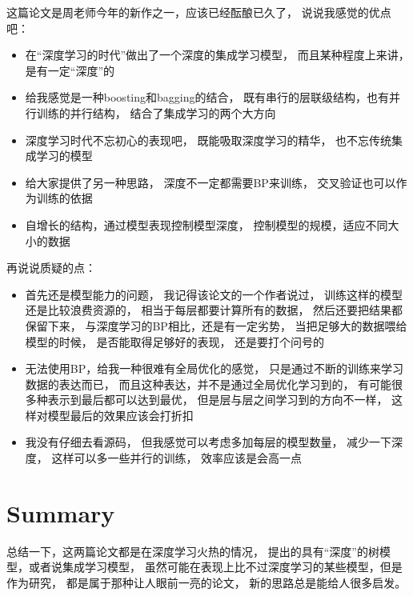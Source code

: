 \documentclass[UTF8]{ctexart}
\begin{document}
这篇论文是周老师今年的新作之一，应该已经酝酿已久了，
说说我感觉的优点吧：
\begin{itemize}
\item
在“深度学习的时代”做出了一个深度的集成学习模型，
而且某种程度上来讲，是有一定“深度”的
\item
给我感觉是一种boosting和bagging的结合，
既有串行的层联级结构，也有并行训练的并行结构，
结合了集成学习的两个大方向
\item
深度学习时代不忘初心的表现吧，
既能吸取深度学习的精华，
也不忘传统集成学习的模型
\item
给大家提供了另一种思路，
深度不一定都需要BP来训练，
交叉验证也可以作为训练的依据
\item
自增长的结构，通过模型表现控制模型深度，
控制模型的规模，适应不同大小的数据
\end{itemize}
再说说质疑的点：
\begin{itemize}
\item
首先还是模型能力的问题，
我记得该论文的一个作者说过，
训练这样的模型还是比较浪费资源的，
相当于每层都要计算所有的数据，
然后还要把结果都保留下来，
与深度学习的BP相比，还是有一定劣势，
当把足够大的数据喂给模型的时候，
是否能取得足够好的表现，
还是要打个问号的
\item
无法使用BP，给我一种很难有全局优化的感觉，
只是通过不断的训练来学习数据的表达而已，
而且这种表达，并不是通过全局优化学习到的，
有可能很多种表示到最后都可以达到最优，
但是层与层之间学习到的方向不一样，
这样对模型最后的效果应该会打折扣
\item
我没有仔细去看源码，
但我感觉可以考虑多加每层的模型数量，
减少一下深度，
这样可以多一些并行的训练，
效率应该是会高一点
\end{itemize}

\section{Summary}
总结一下，这两篇论文都是在深度学习火热的情况，
提出的具有“深度”的树模型，或者说集成学习模型，
虽然可能在表现上比不过深度学习的某些模型，但是作为研究，
都是属于那种让人眼前一亮的论文，
新的思路总是能给人很多启发。
\end{document}
